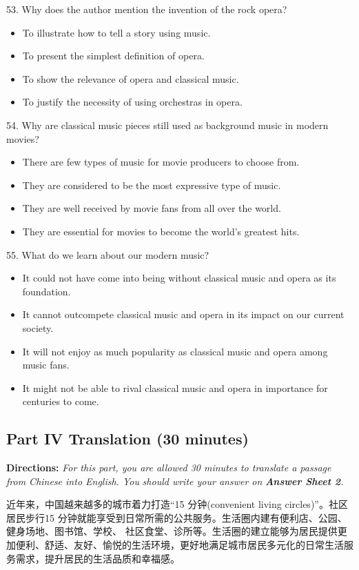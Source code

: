 \documentclass[UTF8,11pt]{ctexart}
\begin{document}
53. Why does the author mention the invention of the rock opera?


\begin{itemize}[leftmargin=2em,itemsep=.2em,topsep=.4em]\item[A.] To illustrate how to tell a story using music.
\item[B.] To present the simplest definition of opera.
\item[C.] To show the relevance of opera and classical music.
\item[D.] To justify the necessity of using orchestras in opera.
\end{itemize}

54. Why are classical music pieces still used as background music in modern movies?


\begin{itemize}[leftmargin=2em,itemsep=.2em,topsep=.4em]\item[A.] There are few types of music for movie producers to choose from.
\item[B.] They are considered to be the most expressive type of music.
\item[C.] They are well received by movie fans from all over the world.
\item[D.] They are essential for movies to become the world’s greatest hits.
\end{itemize}

55. What do we learn about our modern music?


\begin{itemize}[leftmargin=2em,itemsep=.2em,topsep=.4em]\item[A.] It could not have come into being without classical music and opera as its foundation.
\item[B.] It cannot outcompete classical music and opera in its impact on our current society.
\item[C.] It will not enjoy as much popularity as classical music and opera among music fans.
\item[D.] It might not be able to rival classical music and opera in importance for centuries to come.
\end{itemize}

\subsection*{\textbf{Part IV Translation (30 minutes)}}


\textbf{Directions: }\textit{For this part, you are allowed 30 minutes to translate a passage from Chinese into English. You} \textit{should write your answer on }\textbf{\textit{Answer Sheet 2}}\textit{.}


近年来，中国越来越多的城市着力打造“15 分钟(convenient living circles)”。社区居民步行15 分钟就能享受到日常所需的公共服务。生活圈内建有便利店、公园、健身场地、图书馆、学校、 社区食堂、诊所等。生活圈的建立能够为居民提供更加便利、舒适、友好、愉悦的生活环境，更好地满足城市居民多元化的日常生活服务需求，提升居民的生活品质和幸福感。
\end{document}
